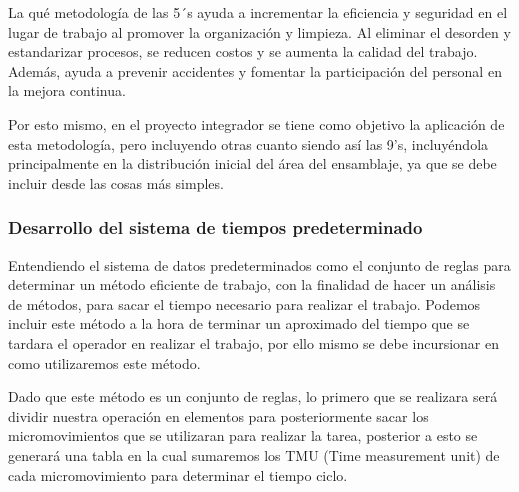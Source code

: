     La qué metodología de las 5´s ayuda a incrementar la eficiencia y seguridad en el lugar de trabajo al promover la organización y limpieza. Al eliminar el desorden y estandarizar procesos, se reducen costos y se aumenta la calidad del trabajo. Además, ayuda a  prevenir accidentes y fomentar la participación del personal en la mejora continua. 
    
    
    Por esto mismo, en el proyecto integrador se tiene como objetivo la aplicación  de esta metodología, pero incluyendo otras cuanto siendo así las 9's, incluyéndola principalmente en la distribución inicial del área del ensamblaje, ya que se debe incluir desde las cosas más simples.
    
    \subsubsection{Desarrollo del sistema de tiempos predeterminado}
    
    Entendiendo el sistema de datos predeterminados como el conjunto de reglas para determinar un método eficiente de trabajo, con la finalidad de hacer un análisis de métodos, para sacar el tiempo necesario para realizar el trabajo. Podemos incluir este método a la hora de terminar un aproximado del tiempo que se tardara el operador en realizar el trabajo, por ello mismo se debe incursionar en como utilizaremos este método.
    
    Dado que este método es un conjunto de reglas, lo primero que se realizara será dividir nuestra operación en elementos para posteriormente sacar los micromovimientos que se utilizaran para realizar la tarea, posterior a esto se generará una tabla en la cual sumaremos los TMU (Time measurement unit) de cada micromovimiento para determinar el tiempo ciclo.
    
